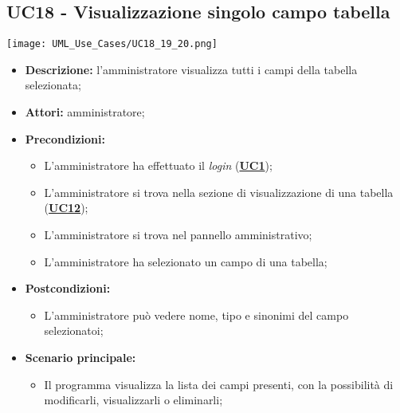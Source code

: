 \subsection{UC18 - Visualizzazione singolo campo tabella}
\label{sec:UC18}
\texttt{[image: UML\_Use\_Cases/UC18\_19\_20.png]}
\begin{itemize}
	\item \textbf{Descrizione:} l’amministratore visualizza tutti i campi della tabella selezionata;
	\item \textbf{Attori:} amministratore;
	\item \textbf{Precondizioni:} 
	\begin{itemize}
		\item L’amministratore ha effettuato il \textit{login} (\hyperref[sec:UC1]{\textbf{UC1}});
		\item L’amministratore si trova nella sezione di visualizzazione di una tabella (\hyperref[sec:UC12]{\textbf{UC12}});
		\item L’amministratore si trova nel pannello amministrativo;
		\item L'amministratore ha selezionato un campo di una tabella;
	\end{itemize}
	\item \textbf{Postcondizioni:} 
	\begin{itemize}
		\item L'amministratore può vedere nome, tipo e sinonimi del campo selezionatoi;
	\end{itemize}
	\item \textbf{Scenario principale:} 
	\begin{itemize}
		\item Il programma visualizza la lista dei campi presenti, con la possibilità di modificarli, visualizzarli o eliminarli;
	\end{itemize}
\end{itemize}

